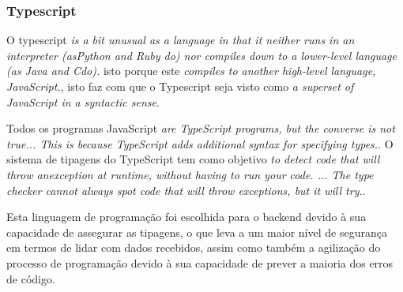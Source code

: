 \newpage

\subsubsection{Typescript}
O typescript \emph{is  a  bit  unusual  as  a  language  in  that  it  neither  runs  in  an  interpreter  (asPython  and  Ruby  do)  nor  compiles  down  to  a  lower-level  language  (as  Java  and  Cdo).}\citep{typescript} isto porque este \emph{compiles  to  another  high-level  language,  JavaScript.}\citep{typescript}, isto faz com que o Typescript seja visto como \emph{a  superset  of  JavaScript  in  a  syntactic  sense}.

Todos os programas JavaScript \emph{are  TypeScript  programs,  but  the  converse  is  not  true... This  is  because  TypeScript adds additional syntax for specifying types.}. O sistema de tipagens do TypeScript tem como objetivo \emph{to  detect  code  that  will  throw  anexception  at  runtime,  without  having  to  run  your  code. ... The  type  checker  cannot always spot code that will throw exceptions, but it will try.}\citep{typescript}.

Esta linguagem de programação foi escolhida para o backend devido à sua capacidade de assegurar as tipagens, o que leva a um maior nível de segurança em termos de lidar com dados recebidos, assim como também a agilização do processo de programação devido à sua capacidade de prever a maioria dos erros de código.



\newpage








